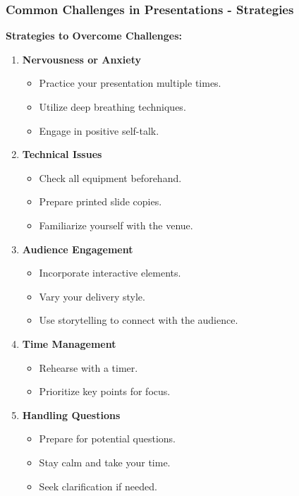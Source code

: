 \documentclass{beamer}
\begin{document}
\begin{frame}[fragile]
    \frametitle{Common Challenges in Presentations - Strategies}
    \textbf{Strategies to Overcome Challenges:}
    \begin{enumerate}
        \item \textbf{Nervousness or Anxiety}
            \begin{itemize}
                \item Practice your presentation multiple times.
                \item Utilize deep breathing techniques.
                \item Engage in positive self-talk.
            \end{itemize}
        \item \textbf{Technical Issues}
            \begin{itemize}
                \item Check all equipment beforehand.
                \item Prepare printed slide copies.
                \item Familiarize yourself with the venue.
            \end{itemize}
        \item \textbf{Audience Engagement}
            \begin{itemize}
                \item Incorporate interactive elements.
                \item Vary your delivery style.
                \item Use storytelling to connect with the audience.
            \end{itemize}
        \item \textbf{Time Management}
            \begin{itemize}
                \item Rehearse with a timer.
                \item Prioritize key points for focus.
            \end{itemize}
        \item \textbf{Handling Questions}
            \begin{itemize}
                \item Prepare for potential questions.
                \item Stay calm and take your time.
                \item Seek clarification if needed.
            \end{itemize}
    \end{enumerate}
\end{frame}
\end{document}
